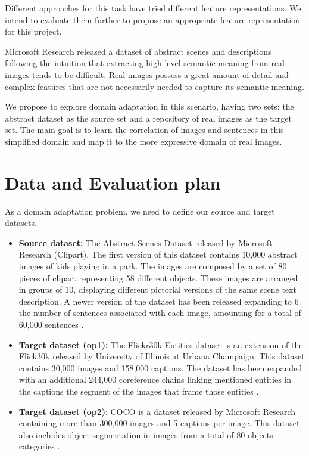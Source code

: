\documentclass[11pt]{article}
\begin{document}
Different approaches for this task have tried different feature representations. We intend to evaluate them further to propose an appropriate feature representation for this project.

Microsoft Research released a dataset of abstract scenes and descriptions following the intuition that
extracting high-level semantic meaning from real images tends to be difficult. Real images possess a great amount of detail and complex features that are not necessarily needed to capture its semantic meaning. 

We propose to explore domain adaptation in this scenario, having two sets: the abstract dataset as the source set and a repository of real images as the target set. The main goal is to learn the correlation of images and sentences in this simplified domain and map it to the more expressive domain of real images. 


\section{Data and Evaluation plan}

As a domain adaptation problem, we need to define our source and target datasets. 

\begin{itemize}
\item \textbf{Source dataset:} The Abstract Scenes Dataset released by Microsoft Research (Clipart). The first version of this dataset contains 10,000 abstract images of kids playing in a park. The images are composed by a set of 80 pieces of clipart representing 58 different objects. These images are arranged in groups of 10, displaying different pictorial versions of the same scene text description. A newer version of the dataset has been released expanding to 6 the number of sentences associated with each image, amounting for a total of 60,000 sentences \cite{Zitnick_2013_ICCV_Workshops}. 
\item \textbf{Target dataset (op1):} The Flickr30k Entities dataset is an extension of the Flick30k released by University of Illinois at Urbana Champaign. This dataset contains 30,000 images and 158,000 captions. The dataset has been expanded with an additional 244,000 coreference chains linking mentioned entities in the captions the segment of the images that frame those entities \cite{DBLP:journals/corr/PlummerWCCHL15}. 
\item \textbf{Target dataset (op2)}: COCO is a dataset released by Microsoft Research containing more than 300,000 images and 5 captions per image. This dataset also includes object segmentation in images from a total of 80 objects categories \cite{DBLP:journals/corr/LinMBHPRDZ14}. 
\end{itemize}
\end{document}
